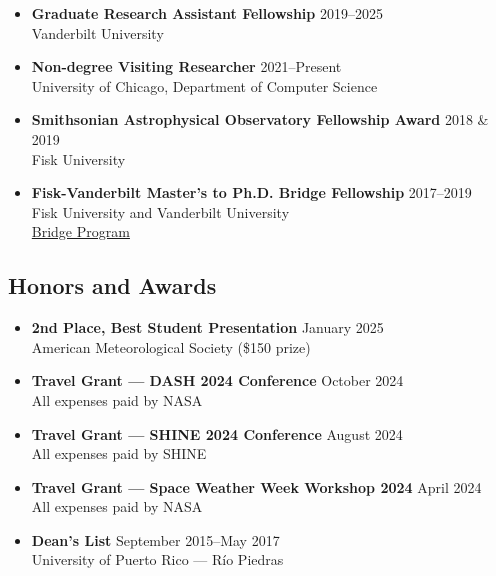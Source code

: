 \documentclass[11pt,a4paper]{article}
\begin{document}
\begin{itemize}[leftmargin=0em, itemsep=0.5em, label={}]
    \item \textbf{Graduate Research Assistant Fellowship} \hfill 2019–2025\\
    Vanderbilt University
    
    \item \textbf{Non-degree Visiting Researcher} \hfill 2021–Present\\
    University of Chicago, Department of Computer Science
    
    \item \textbf{Smithsonian Astrophysical Observatory Fellowship Award} \hfill 2018 \& 2019\\
    Fisk University
    
    \item \textbf{Fisk-Vanderbilt Master's to Ph.D. Bridge Fellowship} \hfill 2017–2019\\
    Fisk University and Vanderbilt University\\
    \href{https://www.fisk-vanderbilt-bridge.org/program}{Bridge Program}
\end{itemize}

\subsection*{Honors and Awards}

\begin{itemize}[leftmargin=0em, itemsep=0.5em, label={}]
    \item \textbf{2nd Place, Best Student Presentation} \hfill January 2025\\
    American Meteorological Society (\$150 prize)
    
    \item \textbf{Travel Grant — DASH 2024 Conference} \hfill October 2024\\
    All expenses paid by NASA
    
    \item \textbf{Travel Grant — SHINE 2024 Conference} \hfill August 2024\\
    All expenses paid by SHINE
    
    \item \textbf{Travel Grant — Space Weather Week Workshop 2024} \hfill April 2024\\
    All expenses paid by NASA
    
    \item \textbf{Dean's List} \hfill September 2015–May 2017\\
    University of Puerto Rico — Río Piedras
\end{itemize}
\end{document}
